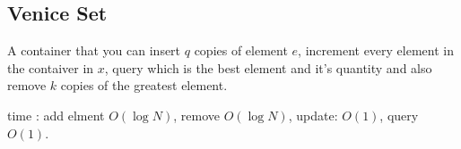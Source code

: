 \subsection{Venice Set}

A container that you can insert $q$ copies of element $e$, increment every element in the contaiver in $x$, query which is the best element and it's quantity and also remove $k$ copies of the greatest element.

time : add elment $O(\log{N})$, remove $O(\log{N})$, update: $O(1)$, query $O(1)$.
